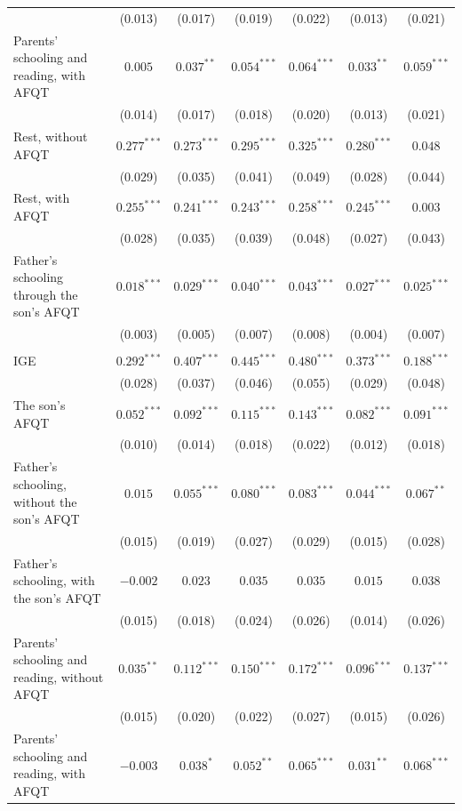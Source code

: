 \begin{table}[!htbp]
{{\begin{tabular}{lcccccc}
 & (0.013) & (0.017) & (0.019) & (0.022) & (0.013) & (0.021) \\
Parents' schooling and reading, with AFQT & $0.005$ & $0.037^{**}$ & $0.054^{***}$ & $0.064^{***}$ & $0.033^{**}$ & $0.059^{***}$ \\
 & (0.014) & (0.017) & (0.018) & (0.020) & (0.013) & (0.021) \\
Rest, without AFQT & $0.277^{***}$ & $0.273^{***}$ & $0.295^{***}$ & $0.325^{***}$ & $0.280^{***}$ & $0.048$ \\
 & (0.029) & (0.035) & (0.041) & (0.049) & (0.028) & (0.044) \\
Rest, with AFQT & $0.255^{***}$ & $0.241^{***}$ & $0.243^{***}$ & $0.258^{***}$ & $0.245^{***}$ & $0.003$ \\
 & (0.028) & (0.035) & (0.039) & (0.048) & (0.027) & (0.043) \\
Father's schooling through the son's AFQT & $0.018^{***}$ & $0.029^{***}$ & $0.040^{***}$ & $0.043^{***}$ & $0.027^{***}$ & $0.025^{***}$ \\
 & (0.003) & (0.005) & (0.007) & (0.008) & (0.004) & (0.007) \\
\addlinespace
\multicolumn{7}{l}{\textit{B. White sons}} \\
IGE & $0.292^{***}$ & $0.407^{***}$ & $0.445^{***}$ & $0.480^{***}$ & $0.373^{***}$ & $0.188^{***}$ \\
 & (0.028) & (0.037) & (0.046) & (0.055) & (0.029) & (0.048) \\
The son's AFQT & $0.052^{***}$ & $0.092^{***}$ & $0.115^{***}$ & $0.143^{***}$ & $0.082^{***}$ & $0.091^{***}$ \\
 & (0.010) & (0.014) & (0.018) & (0.022) & (0.012) & (0.018) \\
Father's schooling, without the son's AFQT & $0.015$ & $0.055^{***}$ & $0.080^{***}$ & $0.083^{***}$ & $0.044^{***}$ & $0.067^{**}$ \\
 & (0.015) & (0.019) & (0.027) & (0.029) & (0.015) & (0.028) \\
Father's schooling, with the son's AFQT & $-0.002$ & $0.023$ & $0.035$ & $0.035$ & $0.015$ & $0.038$ \\
 & (0.015) & (0.018) & (0.024) & (0.026) & (0.014) & (0.026) \\
Parents' schooling and reading, without AFQT & $0.035^{**}$ & $0.112^{***}$ & $0.150^{***}$ & $0.172^{***}$ & $0.096^{***}$ & $0.137^{***}$ \\
 & (0.015) & (0.020) & (0.022) & (0.027) & (0.015) & (0.026) \\
Parents' schooling and reading, with AFQT & $-0.003$ & $0.038^{*}$ & $0.052^{**}$ & $0.065^{***}$ & $0.031^{**}$ & $0.068^{***}$ \\

\end{tabular}}}
\end{table}
